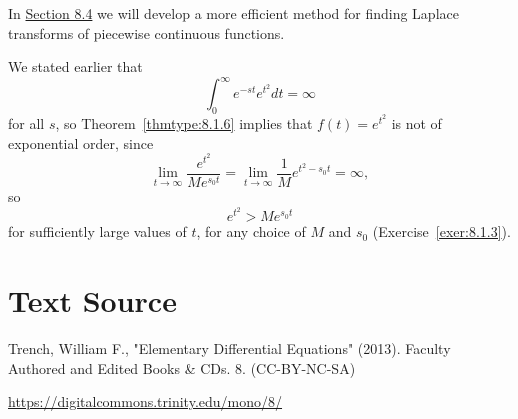 \documentclass{ximera}
\begin{document}
\begin{remark}
In \href{https://xerxes.ximera.org/differentialequations/main/unitStepFunction/unitStepFunction}{Section 8.4} we will develop a more efficient
method for finding Laplace transforms of piecewise continuous functions.
\end{remark}

\begin{example}\label{example:8.1.11}
We stated  earlier that
$$
\int_0^\infty e^{-st} e^{t^2} dt=\infty
$$
for all $s$, so Theorem~\ref{thmtype:8.1.6} implies that $f(t)=e^{t^2}$
is not  of exponential order, since
$$
\lim_{t\rightarrow\infty} \frac{e^{t^2}}{Me^{s_0t}}=\lim_{t\rightarrow\infty} \frac{1}{M} e^{t^2-s_0t}=\infty,
$$
so
$$
e^{t^2}>Me^{s_0t}
$$
for sufficiently large values of $t$, for any choice of $M$ and $s_{0}$
(Exercise~\ref{exer:8.1.3}).
\end{example}


\section*{Text Source}
Trench, William F., "Elementary Differential Equations" (2013). Faculty Authored and Edited Books \& CDs. 8. (CC-BY-NC-SA)

\href{https://digitalcommons.trinity.edu/mono/8/}{https://digitalcommons.trinity.edu/mono/8/}
\end{document}
